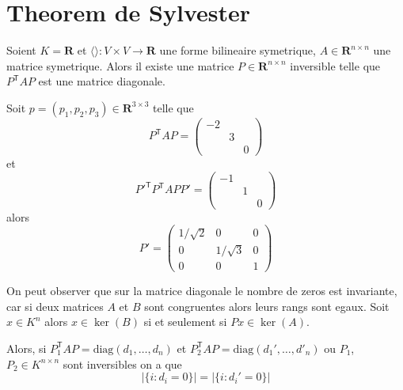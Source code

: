 \section{Theorem de Sylvester}
Soient $K=\mathbf{R}$ et $\langle  \rangle:V\times V\to \mathbf{R}$ une forme bilineaire symetrique, $A\in \mathbf{R}^{n\times n}$ une matrice symetrique. Alors il existe une matrice $P\in \mathbf{R}^{n\times n}$ inversible telle que $P^{\mathsf{T}}AP$ est une matrice diagonale.
\begin{example}
Soit $p=(p_{1},p_{2},p_{3})\in \mathbf{R}^{3\times 3}$  telle que 
$$
P^{\mathsf{T}}AP=\begin{pmatrix}
-2 &  &  \\
 & 3 &  \\
 &  & 0
\end{pmatrix}
$$
et
$$
P'^{\mathsf{T}}P^{\mathsf{T}}APP'=\begin{pmatrix}
-1 &   &  \\
 & 1 &  \\
 &  & 0
\end{pmatrix}
$$
alors 
$$
P'=\begin{pmatrix}
1/\sqrt{ 2 } & 0 & 0 \\
0 & 1/\sqrt{ 3 } & 0 \\
0 &  0 & 1
\end{pmatrix}
$$
\end{example}

On peut observer que sur la matrice diagonale le nombre de zeros est invariante, car si deux matrices $A$ et $B$ sont congruentes alors leurs rangs sont egaux. Soit $x \in K^{n}$ alors $x \in \ker(B)$ si et seulement si $Px\in \ker(A)$.

Alors, si $P_{1}^{\mathsf{T}}AP=\mathrm{diag}(d_{1},\dots,d_{n})$ et $P_{2}^{\mathsf{T}}AP=\mathrm{diag}(d_{1}',\dots,d'_{n})$ ou $P_{1}$,$P_{2}\in K^{n\times n}$ sont inversibles on a que
$$
|\{ i:d_{i}=0 \}|=|\{ i:d_{i}'=0 \}|
$$


